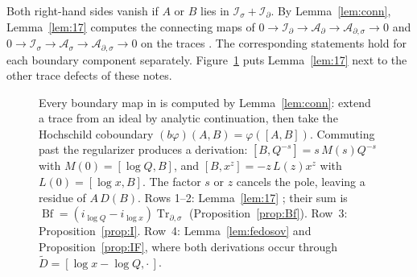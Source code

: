 \documentclass[11pt,oneside,reqno]{article}
\DeclareMathOperator{\Tr}{Tr}
\DeclareMathOperator{\IF}{IF}
\DeclareMathOperator{\Bf}{Bf}
\newcommand{\cA}{\mathcal A}
\newcommand{\cI}{\mathcal I}
\newcommand{\Is}{\mathcal I_\sigma}
\newcommand{\Id}{\mathcal I_\partial}
\newcommand{\As}{\mathcal A_\sigma}
\newcommand{\Ad}{\mathcal A_\partial}
\newcommand{\Ads}{\mathcal A_{\partial,\sigma}}
\newcommand{\Trs}{\Tr_\sigma}
\newcommand{\Trd}{\Tr_\partial}
\newcommand{\Trds}{\Tr_{\partial,\sigma}}
\newcommand{\hTrs}{\widehat{\Tr}_\sigma}
\newcommand{\hTrd}{\widehat{\Tr}_\partial}
\newcommand{\lQ}{\log Q}
\newcommand{\lx}{\log x}
\theoremstyle{plain}
\theoremstyle{definition}
\theoremstyle{remark}
\begin{document}
Both right-hand sides vanish if \(A\) or \(B\) lies in \(\Is+\Id\). By
Lemma~\ref{lem:conn}, Lemma~\ref{lem:17} computes the connecting maps of
\(0\to\Id\to\Ad\to\Ads\to0\) and \(0\to\Is\to\As\to\Ads\to0\) on the
traces \cite[(17)--(19)]{MN}. The corresponding statements hold for each
boundary component separately. Figure~\ref{fig:traces} puts
Lemma~\ref{lem:17} next to the other trace defects of these notes.

\begin{figure}[htbp]
\centering
{}
\caption[Extensions of traces and their coboundaries]{Every boundary map
in \cite{MN} is computed by Lemma~\ref{lem:conn}: extend a trace from an
ideal by analytic continuation, then take the Hochschild coboundary
\((b\varphi)(A,B)=\varphi([A,B])\). Commuting past the regularizer produces a
derivation: \([B,Q^{-s}]=s\,M(s)Q^{-s}\) with \(M(0)=[\lQ,B]\), and
\([B,x^z]=-z\,L(z)x^z\) with \(L(0)=[\lx,B]\). The factor \(s\) or \(z\)
cancels the pole, leaving a residue of \(A\,D(B)\). Rows 1--2:
Lemma~\ref{lem:17} \cite[(17)]{MN}; their sum is
\(\Bf=(i_{\lQ}-i_{\lx})\Trds\) (Proposition~\ref{prop:Bf}). Row~3:
Proposition~\ref{prop:I}. Row~4: Lemma~\ref{lem:fedosov} and
Proposition~\ref{prop:IF}, where both derivations occur through
\(\widetilde D=[\lx-\lQ,\cdot\,]\).}
\label{fig:traces}
\end{figure}
\end{document}
